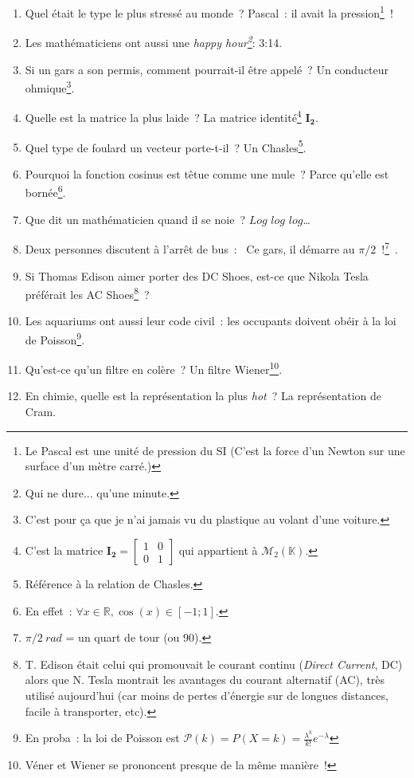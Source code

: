 \documentclass[10pt,a5paper,fullpage]{book}
\begin{document}
\begin{enumerate}
		\item Quel était le type le plus stressé au monde~? Pascal~: il avait la pression\footnote{Le Pascal est une unité de pression du SI (C'est la force d'un Newton sur une surface d'un mètre carré.)}~!
		\item Les mathématiciens ont aussi une \textit{happy hour\footnote{Qui ne dure... qu'une minute.}}: 3:14. 
		\item Si un gars a son permis, comment pourrait-il être appelé~? Un conducteur ohmique\footnote{C'est pour ça que je n'ai jamais vu du plastique au volant d'une voiture.}. 
		\item Quelle est la matrice la plus laide~? La matrice identité\footnote{C’est la matrice $\mathbf{I_{2}} =  				
		\begin{bmatrix}
			1 & 0 \\0 & 1
		\end{bmatrix}$
		qui appartient à $\mathcal{M}_{2}(\mathbb{K})$.} $\mathbf{I_{2}}$.
		\item Quel type de foulard un vecteur porte-t-il~? Un Chasles\footnote{Référence à la relation de Chasles.}. 
		\item Pourquoi la fonction cosinus est têtue comme une mule~? Parce qu’elle est bornée\footnote{En effet~: $\forall x \in \mathbb{R}, \cos(x) \in [-1;1].$}.
		\item Que dit un mathématicien quand il se noie~? $Log$ $log$ $log$\ldots
		\item Deux personnes discutent à l’arrêt de bus~: \guillemotleft~Ce gars, il démarre au $\pi/2$~!\footnote{$\pi/2~rad$ = un quart de tour (ou 90\textdegree).}~\guillemotright. 
		\item Si Thomas Edison aimer porter des DC Shoes, est-ce que Nikola Tesla préférait les AC Shoes\footnote{T. Edison était celui qui promouvait le courant continu (\textit{Direct Current}, DC) alors que N. Tesla montrait les avantages du courant alternatif (AC), très utilisé aujourd'hui (car moins de pertes d'énergie sur de longues distances, facile à transporter, etc).}~?
		\item Les aquariums ont aussi leur code civil~: les occupants doivent obéir à la loi de Poisson\footnote{En proba~: la loi de Poisson est $\mathcal{P}(k) = P(X = k) = \frac{\lambda^{k}}{k!}e^{-\lambda}$}.
		\item Qu’est-ce qu’un filtre en colère~? Un filtre Wiener\footnote{Véner et Wiener se prononcent presque de la même manière~!}.
		\item En chimie, quelle est la représentation la plus \textit{hot}~? La représentation de Cram.

\end{enumerate}
\end{document}
